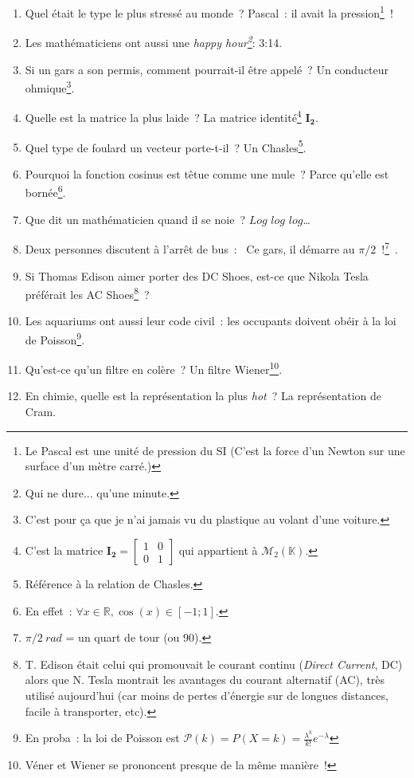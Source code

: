 \documentclass[10pt,a5paper,fullpage]{book}
\begin{document}
\begin{enumerate}
		\item Quel était le type le plus stressé au monde~? Pascal~: il avait la pression\footnote{Le Pascal est une unité de pression du SI (C'est la force d'un Newton sur une surface d'un mètre carré.)}~!
		\item Les mathématiciens ont aussi une \textit{happy hour\footnote{Qui ne dure... qu'une minute.}}: 3:14. 
		\item Si un gars a son permis, comment pourrait-il être appelé~? Un conducteur ohmique\footnote{C'est pour ça que je n'ai jamais vu du plastique au volant d'une voiture.}. 
		\item Quelle est la matrice la plus laide~? La matrice identité\footnote{C’est la matrice $\mathbf{I_{2}} =  				
		\begin{bmatrix}
			1 & 0 \\0 & 1
		\end{bmatrix}$
		qui appartient à $\mathcal{M}_{2}(\mathbb{K})$.} $\mathbf{I_{2}}$.
		\item Quel type de foulard un vecteur porte-t-il~? Un Chasles\footnote{Référence à la relation de Chasles.}. 
		\item Pourquoi la fonction cosinus est têtue comme une mule~? Parce qu’elle est bornée\footnote{En effet~: $\forall x \in \mathbb{R}, \cos(x) \in [-1;1].$}.
		\item Que dit un mathématicien quand il se noie~? $Log$ $log$ $log$\ldots
		\item Deux personnes discutent à l’arrêt de bus~: \guillemotleft~Ce gars, il démarre au $\pi/2$~!\footnote{$\pi/2~rad$ = un quart de tour (ou 90\textdegree).}~\guillemotright. 
		\item Si Thomas Edison aimer porter des DC Shoes, est-ce que Nikola Tesla préférait les AC Shoes\footnote{T. Edison était celui qui promouvait le courant continu (\textit{Direct Current}, DC) alors que N. Tesla montrait les avantages du courant alternatif (AC), très utilisé aujourd'hui (car moins de pertes d'énergie sur de longues distances, facile à transporter, etc).}~?
		\item Les aquariums ont aussi leur code civil~: les occupants doivent obéir à la loi de Poisson\footnote{En proba~: la loi de Poisson est $\mathcal{P}(k) = P(X = k) = \frac{\lambda^{k}}{k!}e^{-\lambda}$}.
		\item Qu’est-ce qu’un filtre en colère~? Un filtre Wiener\footnote{Véner et Wiener se prononcent presque de la même manière~!}.
		\item En chimie, quelle est la représentation la plus \textit{hot}~? La représentation de Cram.

\end{enumerate}
\end{document}
